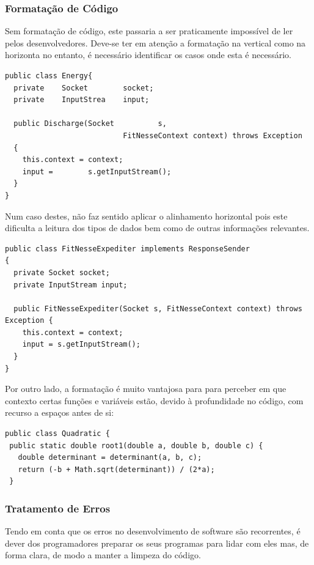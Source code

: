 \documentclass[10pt,portuguese]{article}
\begin{document}
\subsubsection{Formatação de Código}

\par Sem formatação de código, este passaria a ser praticamente impossível de ler pelos desenvolvedores. Deve-se ter em atenção a formatação na vertical como na horizonta no entanto, é necessário identificar os casos onde esta é necessário.

\begin{lstlisting}
public class Energy{
  private    Socket        socket;
  private    InputStrea    input;

  public Discharge(Socket          s,
                           FitNesseContext context) throws Exception
  {
    this.context = context;
    input =        s.getInputStream();
  }
}
\end{lstlisting}

\Par Num caso destes, não faz sentido aplicar o alinhamento horizontal pois este dificulta a leitura dos tipos de dados bem como de outras informações relevantes.

\begin{lstlisting}
public class FitNesseExpediter implements ResponseSender
{
  private Socket socket;
  private InputStream input;

  public FitNesseExpediter(Socket s, FitNesseContext context) throws Exception {
    this.context = context;
    input = s.getInputStream();
  }
}
\end{lstlisting}

\Par Por outro lado, a formatação é muito vantajosa para para perceber em que contexto certas funções e variáveis estão, devido à profundidade no código, com recurso a espaços antes de si:

\begin{lstlisting}
public class Quadratic {
 public static double root1(double a, double b, double c) {
   double determinant = determinant(a, b, c);
   return (-b + Math.sqrt(determinant)) / (2*a);
 }
\end{lstlisting}

\subsubsection{Tratamento de Erros}

\Par Tendo em conta que os erros no desenvolvimento de software são recorrentes, é dever dos programadores preparar os seus programas para lidar com eles mas, de forma clara, de modo a manter a limpeza do código.
\end{document}
